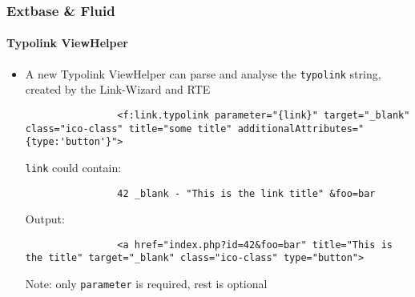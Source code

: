 \begin{frame}[fragile]
	\frametitle{Extbase \& Fluid}
	\framesubtitle{Typolink ViewHelper}

	\lstset{
		basicstyle=\tiny\ttfamily
	}

	\begin{itemize}
		\item A new Typolink ViewHelper can parse and analyse the \texttt{typolink} string, created by the Link-Wizard and RTE

			\begin{lstlisting}
				<f:link.typolink parameter="{link}" target="_blank" class="ico-class" title="some title" additionalAttributes="{type:'button'}">
			\end{lstlisting}

			\texttt{link} could contain:
			\begin{lstlisting}
				42 _blank - "This is the link title" &foo=bar
			\end{lstlisting}

			Output:
			\begin{lstlisting}
				<a href="index.php?id=42&foo=bar" title="This is the title" target="_blank" class="ico-class" type="button">
			\end{lstlisting}

			Note: only \texttt{parameter} is required, rest is optional

	\end{itemize}

\end{frame}



